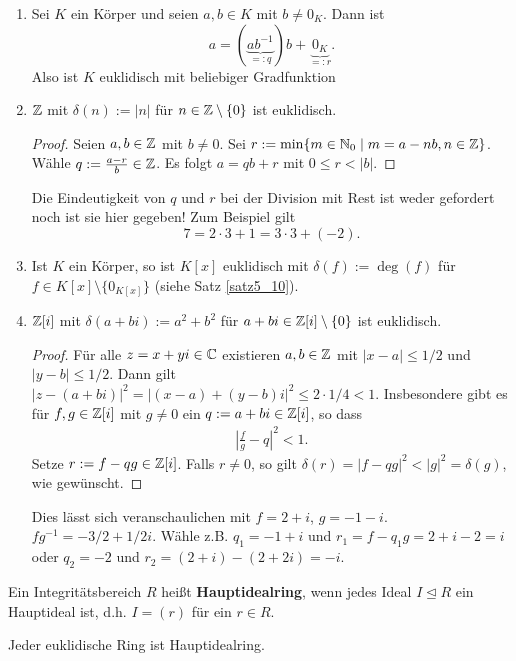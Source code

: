 \begin{beispiel}\label{beispiel5_12}
	\begin{enumerate}[label=(\arabic*)]
		\item Sei $K$ ein Körper und seien $a,b \in K$ mit $b \neq 0_K$. Dann ist
		\[a= (\underbrace{ab^{-1}}_{=:q})b + \underbrace{0_K}_{=:r}.\]
		Also ist $K$ euklidisch mit beliebiger Gradfunktion
		\item $\mathbb{Z}$ mit $\delta(n) := |n|$ für $n \in \mathbb{Z}\setminus\{0\}$ ist euklidisch.
		\begin{proof}
			Seien $a,b \in \mathbb{Z}$ mit $b \neq 0$. Sei $r := \min\{m \in \mathbb{N}_0 \mid m = a-nb, n \in \mathbb{Z}\}$. Wähle $q := \frac{a-r}{b} \in \mathbb{Z}$. Es folgt $a = qb + r$ mit $0 \leq r < |b|$.
		\end{proof}
		Die Eindeutigkeit von $q$ und $r$ bei der Division mit Rest ist weder gefordert noch ist sie hier gegeben! Zum Beispiel gilt
		\[7 = 2 \cdot 3 + 1 = 3 \cdot 3 + (-2).\]
		\item Ist $K$ ein Körper, so ist $K[x]$ euklidisch mit $\delta(f) := \deg(f)$ für $f \in K[x] \setminus \{0_{K[x]}\}$ (siehe Satz \ref{satz5_10}).
		\item $\mathbb{Z}[i]$ mit $\delta(a + bi) := a^2 + b^2$ für $a+bi \in \mathbb{Z}[i] \setminus \{0\}$ ist euklidisch. 
		\begin{proof}
			Für alle $z = x+yi \in \mathbb{C}$ existieren $a,b \in \mathbb{Z}$ mit $|x-a| \leq 1/2$ und $|y-b| \leq 1/2$.  Dann gilt $|z-(a+bi)|^2 = |(x-a) + (y-b)i|^2 \leq 2 \cdot 1/4 < 1$. Insbesondere gibt es für $f,g \in \mathbb{Z}[i]$ mit $g \neq 0$ ein $q := a + bi \in \mathbb{Z}[i]$, so dass 
			\begin{align*}
				\left|\frac{f}{g} - q\right|^2 < 1.
			\end{align*}
			Setze $r := f - qg \in \mathbb{Z}[i]$. Falls $r \neq 0$, so gilt $\delta(r) = |f-qg|^2 < |g|^2 = \delta(g)$, wie gewünscht. 
		\end{proof}
		Dies lässt sich veranschaulichen mit $f = 2+i$, $g = -1 -i$. $fg^{-1} = -3/2 + 1/2 i$.
		Wähle z.B. $q_1 = -1 + i$ und $r_1 = f-q_1 g = 2+i -2= i$ oder $q_2 = -2$ und $r_2 = (2+i)-(2+ 2i) = -i$.
	\end{enumerate}
\end{beispiel}
\begin{definition}
	Ein Integritätsbereich $R$ heißt \textbf{Hauptidealring}, wenn jedes Ideal $I \unlhd R$ ein Hauptideal ist, d.h. $I = (r)$ für ein $r \in R$.
\end{definition}
\begin{satz}\label{satz5_14}
	Jeder euklidische Ring ist Hauptidealring.
\end{satz}
